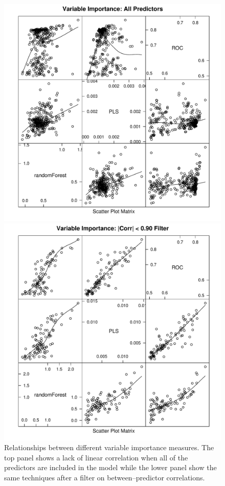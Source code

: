 \documentclass[12pt]{article}
\begin{document}
\begin{figure}[p]
   \begin{center}        
      \includegraphics[clip, width = .5\textwidth]{allPred}
      
      \hspace*{.75 in}  
      
      \includegraphics[clip, width = .5\textwidth]{filteredPred}     
      \caption{Relationships between different variable importance measures. The top panel shows a lack of linear correlation when all of the predictors are included in the model while the lower panel show the same techniques after a filter on between--predictor correlations.}
      \label{f:varImpSplom}         
   \end{center}
\end{figure}
\end{document}
